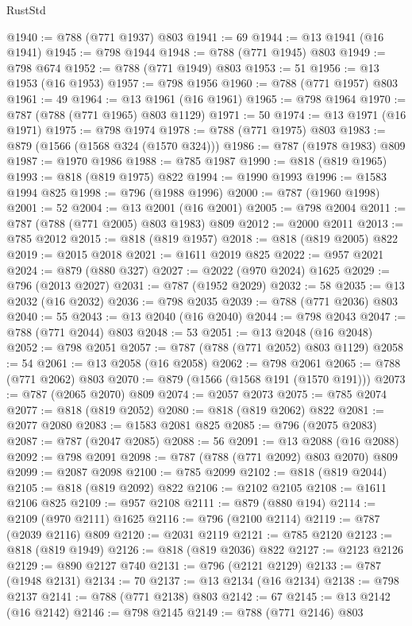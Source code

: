 \begin{lexlean}{RustStd}
\begin{coremodule}
@1940 := @788 (@771 @1937) @803
@1941 := 69
@1944 := @13 @1941 (@16 @1941)
@1945 := @798 @1944
@1948 := @788 (@771 @1945) @803
@1949 := @798 @674
@1952 := @788 (@771 @1949) @803
@1953 := 51
@1956 := @13 @1953 (@16 @1953)
@1957 := @798 @1956
@1960 := @788 (@771 @1957) @803
@1961 := 49
@1964 := @13 @1961 (@16 @1961)
@1965 := @798 @1964
@1970 := @787 (@788 (@771 @1965) @803 @1129)
@1971 := 50
@1974 := @13 @1971 (@16 @1971)
@1975 := @798 @1974
@1978 := @788 (@771 @1975) @803
@1983 := @879 (@1566 (@1568 @324 (@1570 @324)))
@1986 := @787 (@1978 @1983) @809
@1987 := @1970 @1986
@1988 := @785 @1987
@1990 := @818 (@819 @1965)
@1993 := @818 (@819 @1975) @822
@1994 := @1990 @1993
@1996 := @1583 @1994 @825
@1998 := @796 (@1988 @1996)
@2000 := @787 (@1960 @1998)
@2001 := 52
@2004 := @13 @2001 (@16 @2001)
@2005 := @798 @2004
@2011 := @787 (@788 (@771 @2005) @803 @1983) @809
@2012 := @2000 @2011
@2013 := @785 @2012
@2015 := @818 (@819 @1957)
@2018 := @818 (@819 @2005) @822
@2019 := @2015 @2018
@2021 := @1611 @2019 @825
@2022 := @957 @2021
@2024 := @879 (@880 @327)
@2027 := @2022 (@970 @2024) @1625
@2029 := @796 (@2013 @2027)
@2031 := @787 (@1952 @2029)
@2032 := 58
@2035 := @13 @2032 (@16 @2032)
@2036 := @798 @2035
@2039 := @788 (@771 @2036) @803
@2040 := 55
@2043 := @13 @2040 (@16 @2040)
@2044 := @798 @2043
@2047 := @788 (@771 @2044) @803
@2048 := 53
@2051 := @13 @2048 (@16 @2048)
@2052 := @798 @2051
@2057 := @787 (@788 (@771 @2052) @803 @1129)
@2058 := 54
@2061 := @13 @2058 (@16 @2058)
@2062 := @798 @2061
@2065 := @788 (@771 @2062) @803
@2070 := @879 (@1566 (@1568 @191 (@1570 @191)))
@2073 := @787 (@2065 @2070) @809
@2074 := @2057 @2073
@2075 := @785 @2074
@2077 := @818 (@819 @2052)
@2080 := @818 (@819 @2062) @822
@2081 := @2077 @2080
@2083 := @1583 @2081 @825
@2085 := @796 (@2075 @2083)
@2087 := @787 (@2047 @2085)
@2088 := 56
@2091 := @13 @2088 (@16 @2088)
@2092 := @798 @2091
@2098 := @787 (@788 (@771 @2092) @803 @2070) @809
@2099 := @2087 @2098
@2100 := @785 @2099
@2102 := @818 (@819 @2044)
@2105 := @818 (@819 @2092) @822
@2106 := @2102 @2105
@2108 := @1611 @2106 @825
@2109 := @957 @2108
@2111 := @879 (@880 @194)
@2114 := @2109 (@970 @2111) @1625
@2116 := @796 (@2100 @2114)
@2119 := @787 (@2039 @2116) @809
@2120 := @2031 @2119
@2121 := @785 @2120
@2123 := @818 (@819 @1949)
@2126 := @818 (@819 @2036) @822
@2127 := @2123 @2126
@2129 := @890 @2127 @740
@2131 := @796 (@2121 @2129)
@2133 := @787 (@1948 @2131)
@2134 := 70
@2137 := @13 @2134 (@16 @2134)
@2138 := @798 @2137
@2141 := @788 (@771 @2138) @803
@2142 := 67
@2145 := @13 @2142 (@16 @2142)
@2146 := @798 @2145
@2149 := @788 (@771 @2146) @803

\end{coremodule}
\end{lexlean}
